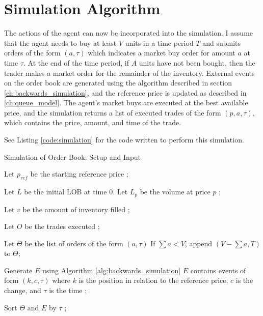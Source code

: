 \section{Simulation Algorithm} \label{ch:simulation_algorithm}

The actions of the agent can now be incorporated into the simulation. I assume that the agent needs to buy at least $V$ units in a time period $T$ and submits orders of the form $(a,\tau)$ which indicates a market buy order for amount $a$ at time $\tau$. At the end of the time period, if $A$ units have not been bought, then the trader makes a market order for the remainder of the inventory. External events on the order book are generated using the algorithm described in section \ref{ch:backwards_simulation}, and the reference price is updated as described in \ref{ch:queue_model}. The agent's market buys are executed at the best available price, and the simulation returns a list of executed trades of the form $(p,a,\tau)$, which contains the price, amount, and time of the trade.

See Listing \ref{code:simulation} for the code written to perform this simulation.

\begin{algorithm}[H]
\SetAlgoLined
\caption{Simulation of Order Book: Setup and Input}
Let $p_{ref}$ be the starting reference price ;

Let $L$ be the initial LOB at time $0$. Let $L_p$ be the volume at price $p$ ;

Let $v$ be the amount of inventory filled ;

Let $O$ be the trades executed ;

Let $\Theta$ be the list of orders of the form $(a,\tau)$ If $\sum{a} < V$, append $(V - \sum{a}, T)$ to $\Theta$;

Generate $E$ using Algorithm \ref{alg:backwards_simulation} $E$ contains events of form $(k,c,\tau)$ where $k$ is the position in relation to the reference price, $c$ is the change, and $\tau$ is the time ;

Sort $\Theta$ and $E$ by $\tau$ ;
\end{algorithm}

